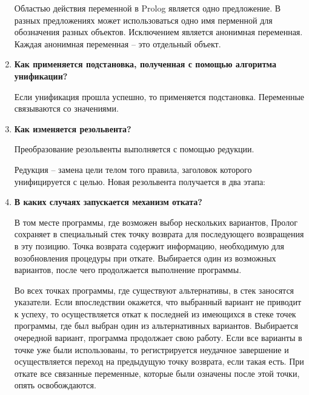 \begin{enumerate}
        Областью действия переменной в Prolog является одно предложение. В разных предложениях может использоваться одно имя перменной для обозначения разных объектов. Исключением является анонимная переменная. Каждая анонимная переменная -- это отдельный объект.

    \item \textbf{Как применяется подстановка, полученная с помощью алгоритма унификации?}

        Если унификация прошла успешно, то применяется подстановка. Переменные связываются со значениями.

    \item \textbf{Как изменяется резольвента?}

        Преобразование резольвенты выполняется с помощью редукции.

        Редукция -- замена цели телом того правила, заголовок которого унифицируется с целью.
        Новая резольвента получается в два этапа:

    \item \textbf{В каких случаях запускается механизм отката?}

        В том месте программы, где возможен выбор нескольких вариантов, Пролог сохраняет в специальный стек точку возврата для последующего возвращения в эту позицию. Точка возврата содержит информацию, необходимую для возобновления процедуры при откате. Выбирается один из возможных вариантов, после чего продолжается выполнение программы.

Во всех точках программы, где существуют альтернативы, в стек заносятся указатели. Если впоследствии окажется, что выбранный вариант не приводит к успеху, то осуществляется откат к последней из имеющихся в стеке точек программы, где был выбран один из альтернативных вариантов. Выбирается очередной вариант, программа продолжает свою работу. Если все варианты в точке уже были использованы, то регистрируется неудачное завершение и осуществляется переход на предыдущую точку возврата, если такая есть. При откате все связанные переменные, которые были означены после этой точки, опять освобождаются.
\end{enumerate}
